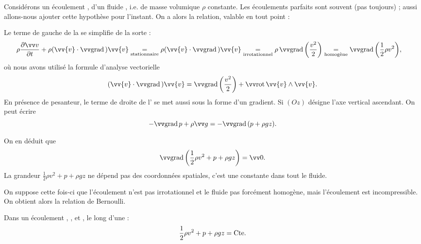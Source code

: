 \documentclass[12pt,fancy]{cours}
\begin{document}
Considérons un écoulement ,  d’un fluide , i.e. de masse volumique $\rho$ constante. Les écoulements parfaits sont souvent (pas toujours)  ; aussi allons-nous ajouter cette hypothèse pour l'instant. On a alors la relation, valable en tout point :

\begin{demo}
Le terme de gauche de la  se simplifie de la sorte :
\begin{align}
\rho \dr{\Vec{v}}{t} +
\rho(\vv{v}\cdot\Grad{})\vv{v} & \underset{\text{stationnaire}}{=}\rho(\vv{v}\cdot\Grad{})\vv{v}
\underset{\text{irrotationnel}}{=} \rho \, \grad{\left(\frac{v^2}{2}\right)}
\underset{\text{homogène}}{=}  \grad{\left(\frac{1}{2}\rho v^2\right)},
\end{align}
où nous avons utilisé la formule d’analyse vectorielle
\begin{equation}\label{eq:a_convec_rot}
  (\vv{v}\cdot\Grad{})\vv{v} = \grad{\left(\frac{v^2}{2}\right)}+  \rot{\vv{v}}\pv\vv{v}.
\end{equation}
En présence de pesanteur, le terme de droite de l’ se met aussi sous la forme d’un gradient.
Si $(Oz)$ désigne l’axe vertical ascendant. On peut écrire
\begin{equation}
  -\grad p + \rho \Vec{g} = -\grad(p+\rho g z).
\end{equation}

On en déduit que
\begin{equation}\label{eq:euler_rot}
\grad{\left(\frac{1}{2}\rho v^{2}+p+\rho gz\right)} = \Vec{0}.
\end{equation}
La grandeur $\frac{1}{2}\rho v^{2}+p+\rho gz$ ne dépend pas des coordonnées spatiales, c’est une constante dans tout le fluide.
\end{demo}


On suppose cette fois-ci que l’écoulement n’est pas irrotationnel et le fluide pas forcément homogène, mais l’écoulement est incompressible. On obtient alors la relation de Bernoulli.
\begin{theorem}\label{form:}
Dans un écoulement , , et , le long d’une  :
\begin{equation*}
\frac{1}{2}\rho v^{2}+p+\rho gz={\rm Cte}.
\end{equation*}

\end{theorem}
\end{document}

